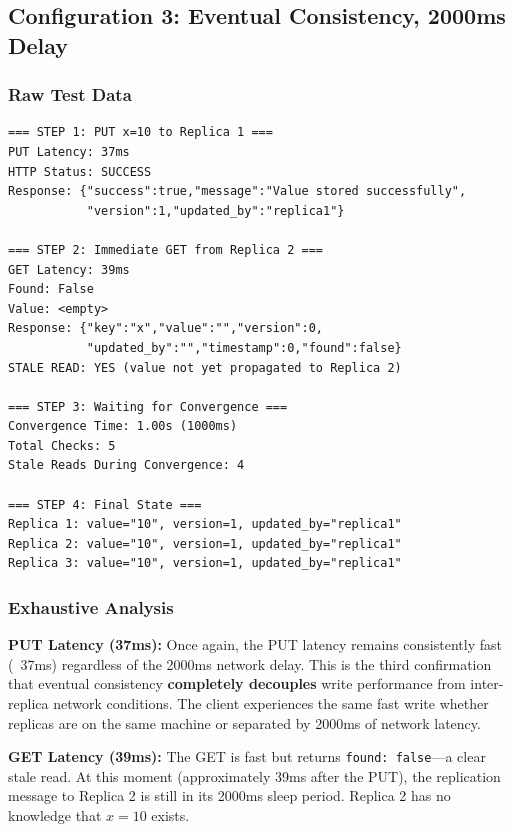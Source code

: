 \documentclass[10pt,a4paper]{article}
\begin{document}
\subsection{Configuration 3: Eventual Consistency, 2000ms Delay}

\subsubsection{Raw Test Data}

\begin{verbatim}
=== STEP 1: PUT x=10 to Replica 1 ===
PUT Latency: 37ms
HTTP Status: SUCCESS
Response: {"success":true,"message":"Value stored successfully",
           "version":1,"updated_by":"replica1"}

=== STEP 2: Immediate GET from Replica 2 ===
GET Latency: 39ms
Found: False
Value: <empty>
Response: {"key":"x","value":"","version":0,
           "updated_by":"","timestamp":0,"found":false}
STALE READ: YES (value not yet propagated to Replica 2)

=== STEP 3: Waiting for Convergence ===
Convergence Time: 1.00s (1000ms)
Total Checks: 5
Stale Reads During Convergence: 4

=== STEP 4: Final State ===
Replica 1: value="10", version=1, updated_by="replica1"
Replica 2: value="10", version=1, updated_by="replica1"
Replica 3: value="10", version=1, updated_by="replica1"
\end{verbatim}

\subsubsection{Exhaustive Analysis}

\textbf{PUT Latency (37ms):} Once again, the PUT latency remains consistently fast (~37ms) regardless of the 2000ms network delay. This is the third confirmation that eventual consistency \textbf{completely decouples} write performance from inter-replica network conditions. The client experiences the same fast write whether replicas are on the same machine or separated by 2000ms of network latency.

\textbf{GET Latency (39ms):} The GET is fast but returns \texttt{found: false}---a clear stale read. At this moment (approximately 39ms after the PUT), the replication message to Replica 2 is still in its 2000ms sleep period. Replica 2 has no knowledge that $x=10$ exists.
\end{document}
